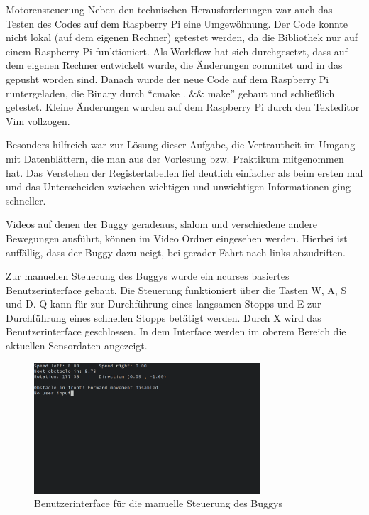 \documentclass[12pt]{report}
\begin{document}
\begin{section}{Motorensteuerung}
  Neben den technischen Herausforderungen war auch das Testen des Codes auf dem
  Raspberry Pi eine Umgewöhnung. Der Code konnte nicht lokal (auf dem eigenen
  Rechner) getestet werden, da die \wiringPi{} Bibliothek nur auf einem Raspberry Pi funktioniert.
  Als Workflow hat sich durchgesetzt, dass auf dem eigenen Rechner entwickelt
  wurde, die Änderungen commitet und in das \githubrepo{} gepusht worden sind.
  Danach wurde der neue Code auf dem Raspberry Pi runtergeladen, die Binary
  durch "`cmake . \&\& make"' gebaut und schließlich getestet. Kleine Änderungen
  wurden auf dem Raspberry Pi durch den Texteditor Vim vollzogen.

  Besonders hilfreich war zur Lösung dieser Aufgabe, die Vertrautheit im Umgang
  mit Datenblättern, die man aus der Vorlesung bzw. Praktikum mitgenommen hat.
  Das Verstehen der Registertabellen fiel deutlich einfacher als beim ersten
  mal und das Unterscheiden zwischen wichtigen und unwichtigen Informationen
  ging schneller.


  Videos auf denen der Buggy geradeaus, slalom und verschiedene andere
  Bewegungen ausführt, können im Video Ordner eingesehen werden.
  Hierbei ist auffällig, dass der Buggy dazu neigt, bei gerader Fahrt nach links
  abzudriften.

  Zur manuellen Steuerung des Buggys wurde ein
  \href{https://invisible-island.net/ncurses/announce.html}{ncurses} basiertes
  Benutzerinterface gebaut. Die Steuerung funktioniert über die Tasten W, A, S
  und D. Q kann für zur Durchführung eines langsamen Stopps und E zur
  Durchführung eines schnellen Stopps betätigt werden. Durch X wird das
  Benutzerinterface geschlossen.
  In dem Interface werden im oberem Bereich die aktuellen Sensordaten angezeigt.

  \begin{figure}[h!]
    \centering
    \includegraphics[width=0.75\textwidth]{lernportfolio_assets/WasdBenutzerinterface.png}
    \caption{Benutzerinterface für die manuelle Steuerung des Buggys}
  \end{figure}

\end{section}
\end{document}
